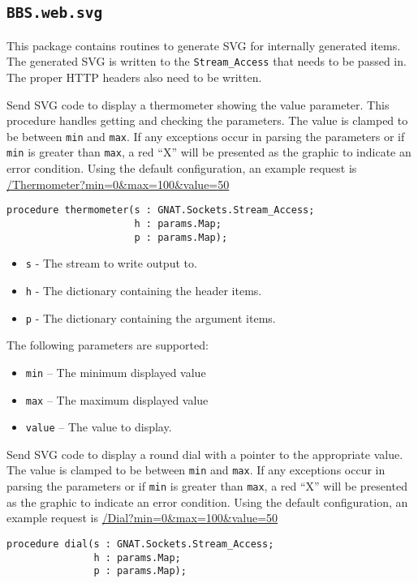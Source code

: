 \documentclass[10pt, openany]{book}
\newcommand{\package}[1]{\texttt{#1}}
\newcommand{\keyword}[1]{\texttt{#1}}
\newcommand{\datatype}[1]{\texttt{#1}}
\begin{document}
\subsection{\package{BBS.web.svg}}
This package contains routines to generate SVG for internally generated items.  The generated SVG is written to the \datatype{Stream\_Access} that needs to be passed in.  The proper HTTP headers also need to be written.

Send SVG code to display a thermometer showing the value parameter.  This procedure handles getting and checking the parameters.  The value is clamped to be between \keyword{min} and \keyword{max}.  If any exceptions occur in parsing the parameters or if \keyword{min} is greater than \keyword{max}, a red ``X'' will be presented as the graphic to indicate an error condition.  Using the default configuration, an example request is \url{/Thermometer?min=0&max=100&value=50}
\begin{lstlisting}
procedure thermometer(s : GNAT.Sockets.Stream_Access;
                      h : params.Map;
                      p : params.Map);
\end{lstlisting}
\begin{itemize}
  \item \keyword{s} - The stream to write output to.
  \item \keyword{h} - The dictionary containing the header items.
  \item \keyword{p} - The dictionary containing the argument items.
\end{itemize}
The following parameters are supported:
\begin{itemize}
  \item \keyword{min} -- The minimum displayed value
  \item \keyword{max} -- The maximum displayed value
  \item \keyword{value} -- The value to display.
\end{itemize}
Send SVG code to display a round dial with a pointer to the appropriate value.  The value is clamped to be between \keyword{min} and \keyword{max}.  If any exceptions occur in parsing the parameters or if \keyword{min} is greater than \keyword{max}, a red ``X'' will be presented as the graphic to indicate an error condition.  Using the default configuration, an example request is \url{/Dial?min=0&max=100&value=50}
\begin{lstlisting}
procedure dial(s : GNAT.Sockets.Stream_Access;
               h : params.Map;
               p : params.Map);
\end{lstlisting}
\end{document}
